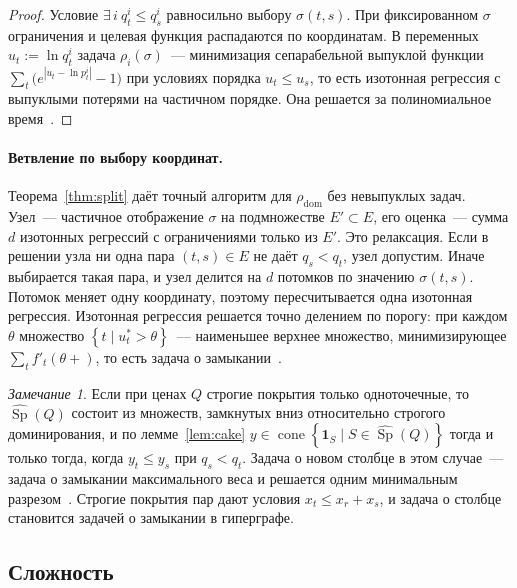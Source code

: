 \documentclass[a4paper,11pt]{article}
\theoremstyle{plain}
\theoremstyle{definition}
\theoremstyle{remark}
\newtheorem*{remark}{Замечание}
\newcommand{\abs}[1]{\left\lvert #1 \right\rvert}
\newcommand{\set}[1]{\left\{ #1 \right\}}
\DeclareMathOperator{\cone}{cone}
\DeclareMathOperator{\Sp}{Sp}
\begin{document}
\begin{proof}
    Условие $\exists\,i\ q^i_t\le q^i_s$ равносильно выбору $\sigma(t,s)$. При фиксированном $\sigma$ ограничения и целевая функция распадаются по координатам. В переменных $u_t:=\ln q^i_t$ задача $\rho_i(\sigma)$~--- минимизация сепарабельной выпуклой функции $\sum_t\bigl(e^{\abs{u_t-\ln p^i_t}}-1\bigr)$ при условиях порядка $u_t\le u_s$, то есть изотонная регрессия с выпуклыми потерями на частичном порядке. Она решается за полиномиальное время~\cite{HochbaumQueyranne}.
\end{proof}

\paragraph{Ветвление по выбору координат.} Теорема~\ref{thm:split} даёт точный алгоритм для $\rho_{\mathrm{dom}}$ без невыпуклых задач. Узел~--- частичное отображение $\sigma$ на подмножестве $E'\subset E$, его оценка~--- сумма $d$ изотонных регрессий с ограничениями только из $E'$. Это релаксация. Если в решении узла ни одна пара $(t,s)\in E$ не даёт $q_s<q_t$, узел допустим. Иначе выбирается такая пара, и узел делится на $d$ потомков по значению $\sigma(t,s)$. Потомок меняет одну координату, поэтому пересчитывается одна изотонная регрессия. Изотонная регрессия решается точно делением по порогу: при каждом $\theta$ множество $\set{t\mid u^*_t>\theta}$~--- наименьшее верхнее множество, минимизирующее $\sum_tf'_t(\theta+)$, то есть задача о замыкании~\cite{HochbaumQueyranne,Picard}.

\begin{remark}
    Если при ценах $Q$ строгие покрытия только одноточечные, то $\widehat{\Sp}(Q)$ состоит из множеств, замкнутых вниз относительно строгого доминирования, и по лемме~\ref{lem:cake} $y\in\cone\set{\mathbf 1_S\mid S\in\widehat{\Sp}(Q)}$ тогда и только тогда, когда $y_t\le y_s$ при $q_s<q_t$. Задача о новом столбце в этом случае~--- задача о замыкании максимального веса и решается одним минимальным разрезом~\cite{Picard}. Строгие покрытия пар дают условия $x_t\le x_r+x_s$, и задача о столбце становится задачей о замыкании в гиперграфе.
\end{remark}

\subsection{Сложность}
\end{document}
